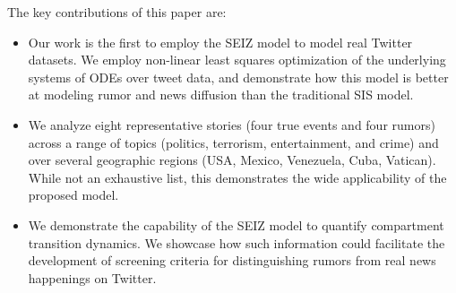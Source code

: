 
The key contributions of this paper are:

\begin{itemize}
\item Our work is the first to employ the SEIZ model to model real Twitter
datasets. We employ non-linear least squares optimization of the underlying
systems of ODEs over
tweet data, and demonstrate how this model is better at modeling
rumor and news diffusion
than the traditional SIS model.
\item We analyze
eight representative stories (four true events and
four rumors) across a range of topics (politics, terrorism, entertainment, and crime) and over several
geographic regions (USA, Mexico, Venezuela, Cuba, Vatican). While not
an exhaustive list, this demonstrates the wide applicability of the
proposed model.
\item We demonstrate the capability of the SEIZ model to quantify
compartment transition dynamics. We showcase how such information
could facilitate the development of screening criteria for distinguishing rumors from real news happenings on Twitter.

\end{itemize}



